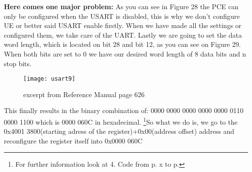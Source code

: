 \documentclass[11pt]{scrartcl}
\begin{document}
\newline
\textbf{Here comes one major problem:} As you can see in Figure 28 the PCE can only be configured when the USART is disabled, this is why we don't configure UE or better said USART enable firstly. When we have made all the settings or configured them, we take care of the UART.
\newpage
Lastly we are going to set the data word length, which is located on bit 28 and bit 12, as you can see on Figure 29. When both bits are set to 0 we have our desired word length of 8 data bits and n stop bits.
\begin{figure}[h]
		\centering
		\texttt{[image: usart9]}
		\caption{excerpt from Reference Manual page 626}
\end{figure}
\newline\newline
This finally results in the binary combination of: 0000 0000 0000 0000 0000 0110 0000 1100 which is 0000 060C in hexadecimal.
\newline\newline
\footnote{\label{foot:22}For further information look at 4. Code from p. x to p.}So what we do is, we go to the 0x4001 3800(starting adress of the register)+0x00(address offset) address and reconfigure the register itself into 0x0000 060C



\newpage
\end{document}

